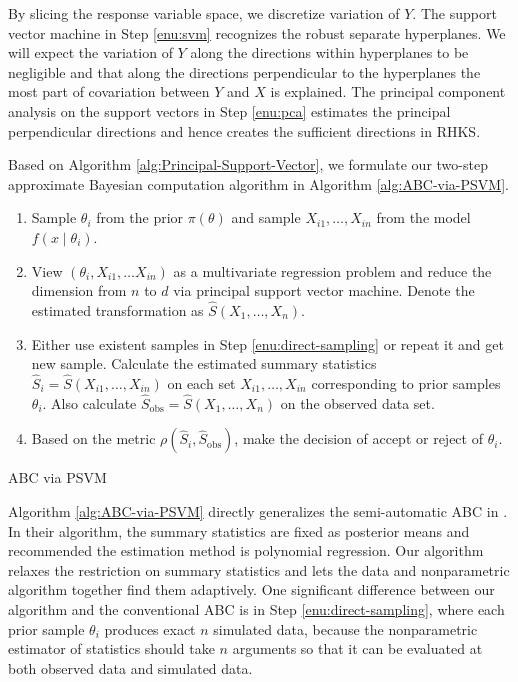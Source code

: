 \documentclass[oneside,english]{amsbook}
\numberwithin{section}{chapter}
\numberwithin{equation}{section}
\numberwithin{figure}{section}
\theoremstyle{plain}
\theoremstyle{plain}
\theoremstyle{definition}
\theoremstyle{plain}
\theoremstyle{plain}
\theoremstyle{remark}
\theoremstyle{definition}
\theoremstyle{definition}
\begin{document}
By slicing the response variable space, we discretize variation of
$Y$. The support vector machine in Step \ref{enu:svm} recognizes
the robust separate hyperplanes. We will expect the variation of $Y$
along the directions within hyperplanes to be negligible and that
along the directions perpendicular to the hyperplanes the most part
of covariation between $Y$ and $X$ is explained. The principal component
analysis on the support vectors in Step \ref{enu:pca} estimates the {{}
} {principal } {{} }perpendicular directions
and hence creates the sufficient directions in RHKS. 

Based on Algorithm \ref{alg:Principal-Support-Vector}, we formulate
our  {two-step }approximate Bayesian computation algorithm
in Algorithm \ref{alg:ABC-via-PSVM}.

\begin{algorithm}
\begin{enumerate}
\item \label{enu:direct-sampling}Sample $\theta_{i}$ from the prior $\pi\left(\theta\right)$
and sample $X_{i1},\ldots,X_{in}$ from the model $f\left(x\mid\theta_{i}\right)$. 
\item View $\left(\theta_{i},X_{i1},\ldots X_{in}\right)$ as a multivariate
regression problem and reduce the dimension from $n$ to $d$ via
principal support vector machine. Denote the estimated transformation
as $\hat{S}\left(X_{1},\ldots,X_{n}\right)$. 
\item Either use existent samples in Step \ref{enu:direct-sampling} or
repeat it and get new sample. Calculate the estimated summary statistics
$\hat{S}_{i}=\hat{S}\left(X_{i1},\ldots,X_{in}\right)$ on each set
$X_{i1},\ldots,X_{in}$ corresponding to prior samples $\theta_{i}$.
Also calculate $\hat{S}_{\mathrm{obs}}=\hat{S}\left(X_{1},\ldots,X_{n}\right)$
on the observed data set.
\item Based on the metric $\rho\left(\hat{S}_{i},\hat{S}_{\mathrm{obs}}\right)$,
make the decision of accept or reject of $\theta_{i}$. 
\end{enumerate}
\protect\caption{\label{alg:ABC-via-PSVM}ABC via PSVM}
\end{algorithm}
Algorithm \ref{alg:ABC-via-PSVM} directly generalizes the semi-automatic
ABC in \citet{fearnhead2012constructing}. In their algorithm, the
summary statistics are fixed as posterior means and recommended the
estimation method is polynomial regression. Our algorithm relaxes
the restriction on summary statistics and{} lets
the data and nonparametric algorithm together find them adaptively.
One significant difference between our algorithm and the conventional
ABC is in Step \ref{enu:direct-sampling}, where each prior sample
$\theta_{i}$ produces exact $n$ simulated data, because the nonparametric
estimator of statistics should take $n$ arguments so that it can
be evaluated at both observed data and simulated data.
\end{document}
